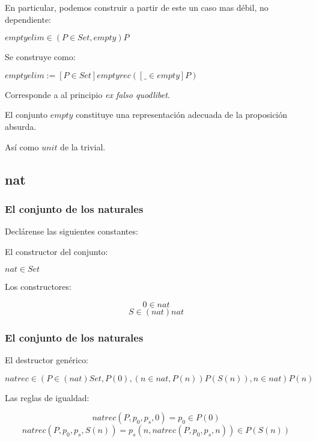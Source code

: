 \documentclass{beamer}
\begin{document}
\begin{frame}

  En particular, podemos construir a partir de este
  un caso mas d\'ebil, no dependiente:

  \begin{center}
    $emptyelim \in (P \in Set, empty) P $
  \end{center}

  \pause

  Se construye como:

  \begin{center}
    $emptyelim := [P \in Set] emptyrec ([ \_ \in empty]P)$
  \end{center}

  \pause

  Corresponde a al principio \emph{ex falso quodlibet}.

  \pause

  El conjunto $empty$ constituye una representaci\'on adecuada de la
  proposici\'on absurda.

  \pause
  As\'i como $unit$ de la trivial.

\end{frame}






\subsection{nat}

\begin{frame}\frametitle{El conjunto de los naturales}

  \pause
  Decl\'arense las siguientes constantes:
  \pause

  El constructor del conjunto:

  \begin{center}
    $nat \in Set$
  \end{center}

  \pause

  Los constructores:

  $$ 0 \in nat$$
  $$ S \in (nat)nat$$
  
\end{frame}\frametitle{El conjunto de los naturales}


\begin{frame}

El destructor gen\'erico:

$$natrec \in (P \in (nat)Set, P(0), (n \in nat, P(n))P(S(n)), n\in nat )P(n)$$
\pause

Las reglas de igualdad:

$$natrec(P,p_0,p_s,0) = p_0 \in P(0)$$
$$natrec(P,p_0,p_s,S(n)) = p_s(n,natrec(P,p_0,p_s,n)) \in P(S(n))$$

\end{frame}
\end{document}
